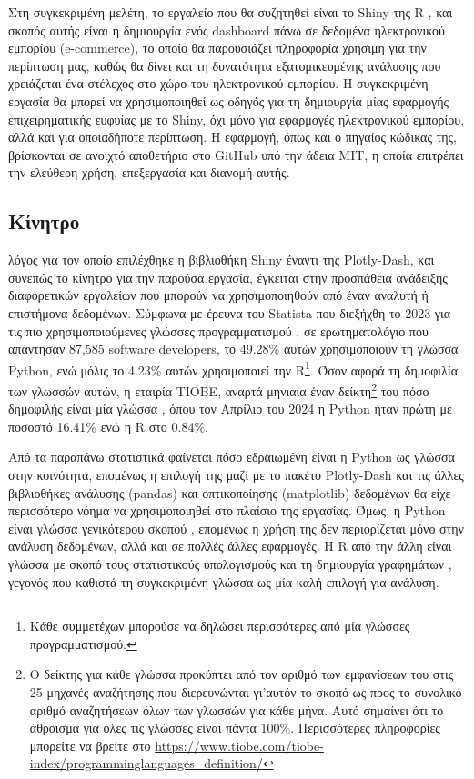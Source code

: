 \documentclass{article}
\begin{document}
Στη συγκεκριμένη μελέτη, το εργαλείο που θα συζητηθεί είναι το Shiny της R \cite{chang2024shiny}, και σκοπός αυτής είναι η δημιουργία ενός dashboard πάνω σε δεδομένα ηλεκτρονικού εμπορίου (e-commerce), το οποίο θα παρουσιάζει πληροφορία χρήσιμη για την περίπτωση μας, καθώς θα δίνει και τη δυνατότητα εξατομικευμένης ανάλυσης που χρειάζεται ένα στέλεχος στο χώρο του ηλεκτρονικού εμπορίου. \cite{fedirko2021data} Η συγκεκριμένη εργασία θα μπορεί να χρησιμοποιηθεί ως οδηγός για τη δημιουργία μίας εφαρμογής επιχειρηματικής ευφυίας με το Shiny, όχι μόνο για εφαρμογές ηλεκτρονικού εμπορίου, αλλά και για οποιαδήποτε περίπτωση. Η εφαρμογή, όπως και ο πηγαίος κώδικας της, βρίσκονται σε ανοιχτό αποθετήριο στο GitHub υπό την άδεια MIT, η οποία επιτρέπει την ελεύθερη χρήση, επεξεργασία και διανομή αυτής.


\subsection{Κίνητρο}

 λόγος για τον οποίο επιλέχθηκε η βιβλιοθήκη Shiny έναντι της Plotly-Dash, και συνεπώς το κίνητρο για την παρούσα εργασία, έγκειται στην προσπάθεια ανάδειξης διαφορετικών εργαλείων που μπορούν να χρησιμοποιηθούν από έναν αναλυτή ή επιστήμονα δεδομένων. Σύμφωνα με έρευνα του Statista που διεξήχθη το 2023 για τις πιο χρησιμοποιούμενες γλώσσες προγραμματισμού \cite{Vailshery_2024}, σε ερωτηματολόγιο που απάντησαν 87,585 software developers, το 49.28\% αυτών χρησιμοποιούν τη γλώσσα Python, ενώ μόλις το 4.23\% αυτών χρησιμοποιεί την R\footnote{Κάθε συμμετέχων μπορούσε να δηλώσει περισσότερες από μία γλώσσες προγραμματισμού.}. Όσον αφορά τη δημοφιλία των γλωσσών αυτών, η εταιρία TIOBE, αναρτά μηνιαία έναν δείκτη\footnote{Ο δείκτης για κάθε γλώσσα προκύπτει από τον αριθμό των εμφανίσεων του στις 25 μηχανές αναζήτησης που διερευνώνται γι’αυτόν το σκοπό ως προς το συνολικό αριθμό αναζητήσεων όλων των γλωσσών για κάθε μήνα. Αυτό σημαίνει ότι το άθροισμα για όλες τις γλώσσες είναι πάντα 100\%. Περισσότερες πληροφορίες μπορείτε να βρείτε στο \url{https://www.tiobe.com/tiobe-index/programminglanguages_definition/}} του πόσο δημοφιλής είναι μία γλώσσα \cite{TIOBE_2022}, όπου τον Απρίλιο του 2024 η Python ήταν πρώτη με ποσοστό 16.41\% ενώ η R στο 0.84\%. 

Από τα παραπάνω στατιστικά φαίνεται πόσο εδραιωμένη είναι η Python ως γλώσσα στην κοινότητα, επομένως η επιλογή της μαζί με το πακέτο Plotly-Dash και τις άλλες βιβλιοθήκες ανάλυσης (pandas) και οπτικοποίησης (matplotlib) δεδομένων θα είχε περισσότερο νόημα να χρησιμοποιηθεί στο πλαίσιο της εργασίας. Όμως, η Python είναι γλώσσα γενικότερου σκοπού \cite{Wikipedia_2024}, επομένως η χρήση της δεν περιορίζεται μόνο στην ανάλυση δεδομένων, αλλά και σε πολλές άλλες εφαρμογές. Η R από την άλλη είναι γλώσσα με σκοπό τους στατιστικούς υπολογισμούς και τη δημιουργία γραφημάτων \cite{Rprogramminglanguage}, γεγονός που καθιστά τη συγκεκριμένη γλώσσα ως μία καλή επιλογή για ανάλυση.
\end{document}
